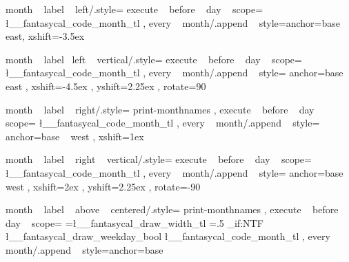 %
%



\tikzset
  {
    month ~ label ~ left/.style=
      {
        execute ~ before ~ day ~ scope=
          {
             { \l__fantasycal_code_month_tl }
          }
        ,
        every ~ month/.append ~ style={anchor=base ~ east, xshift=-3.5ex}
      }
  }

\tikzset
  {
    month ~ label ~left ~ vertical/.style=
      {
        execute ~ before ~ day ~ scope=
          {
             { \l__fantasycal_code_month_tl } 
          } ,
        every ~ month/.append ~ style=
          { anchor=base ~ east , xshift=-4.5ex , yshift=2.25ex , rotate=90 }
      }
  }

\tikzset
  {
    month ~ label ~ right/.style=
      {
        print-monthnames ,
        execute ~ before ~ day ~ scope=
          {
              {
                {
                  \l__fantasycal_code_month_tl
                }
              }
          }
        ,
        every ~ month/.append ~ style={ anchor=base ~ west , xshift=1ex }
    }
  }

\tikzset
  {
    month ~ label ~ right ~ vertical/.style=
      {
        execute ~ before ~ day ~ scope=
          {
              {
                {
                  \l__fantasycal_code_month_tl%
                }
              }
          }
        ,
        every ~ month/.append ~ style=
          { anchor=base ~ west , xshift=2ex , yshift=2.25ex , rotate=-90 }
    }
  }




\tikzset
  {
    month ~ label ~ above ~ centered/.style=
      {
        print-monthnames ,
        execute ~ before ~ day ~ scope=
          {
              {
                {
                  \pgf@xb=\l__fantasycal_draw_width_tl\pgf@xa%
                  \pgf@xb=.5\pgf@xb%
                  \pgftransformxshift{\pgf@xb}
                  \bool_if:NTF \l__fantasycal_draw_weekday_bool
                    {  }
                    {  }
                  \l__fantasycal_code_month_tl
                }
              } 
          }
        ,
        every ~ month/.append ~ style={anchor=base}
      }
  }

